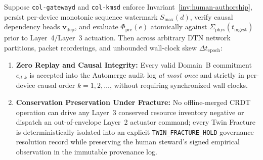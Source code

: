 \begin{theorem}
\label{thm:domain-b-fracture}
Suppose \texttt{col-gatewayd} and \texttt{col-kmsd} enforce Invariant~\ref{inv:human-authorship}, persist per-device monotonic sequence watermark $S_{\max}(d)$, verify causal dependency heads $\mathbf{v}_{\mathrm{dep}}$, and evaluate $\Phi_{\mathrm{pre}}(e)$ atomically against $\Sigma_{\mathrm{phys}}(t_{\mathrm{ingest}})$ prior to Layer~4/Layer~3 actuation. Then across arbitrary DTN network partitions, packet reorderings, and unbounded wall-clock skew $\Delta t_{\mathrm{epoch}}$:
\begin{enumerate}
  \item \textbf{Zero Replay and Causal Integrity:} Every valid Domain~B commitment $e_{d,k}$ is accepted into the Automerge audit log \emph{at most once} and strictly in per-device causal order $k = 1, 2, \dots$, without requiring synchronized wall clocks.
  \item \textbf{Conservation Preservation Under Fracture:} No offline-merged CRDT operation can drive any Layer~3 conserved resource inventory negative or dispatch an out-of-envelope Layer~2 actuator command; every Twin Fracture is deterministically isolated into an explicit \texttt{TWIN\_FRACTURE\_HOLD} governance resolution record while preserving the human steward's signed empirical observation in the immutable provenance log.
\end{enumerate}
\end{theorem}

